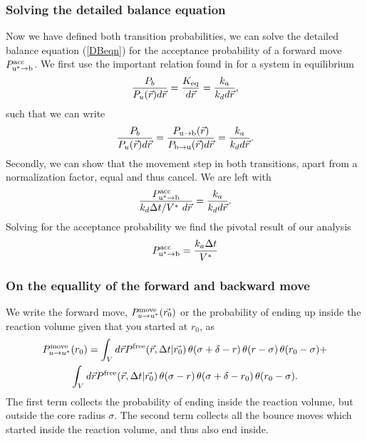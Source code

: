 \subsubsection{Solving the detailed balance equation}

Now we have defined both transition probabilities, we can solve the detailed balance equation (\ref{DBeqn}) for the acceptance probability of a forward move $P^{\rm acc}_{{\rm u}^* \rightarrow {\rm b}}$. We first use the important relation found in \cite{Morelli2008a} for a system in equilibrium
\begin{equation}
 \frac{P_b}{P_u(\vec{r})d\vec{r}} = \frac{K_{\rm eq}}{d\vec{r}} = \frac{k_a}{k_d d\vec{r}},
\end{equation}
such that we can write
\begin{equation}
 \frac{P_b}{P_u(\vec{r})d\vec{r}} = \frac{P_{ \rm{u} \rightarrow \rm{b} }(\vec{r})}{P_{ \rm{b} \rightarrow \rm{u} }(\vec{r})d\vec{r}} = \frac{k_a}{k_d d\vec{r}}.
\end{equation}
Secondly, we can show that the movement step in both transitions, apart from a normalization factor, equal and thus cancel. We are left with
\begin{equation}
 \frac{P^{\rm acc}_{{\rm u}^* \rightarrow {\rm b}}}{k_d \Delta t/V^* \,\, d\vec{r}} = \frac{k_a}{k_d d\vec{r}}.
\label{semi-pivotal}
\end{equation}
Solving for the acceptance probability we find the pivotal result of our analysis
\begin{equation}
 P^{\rm acc}_{{\rm u}^* \rightarrow {\rm b}} = \frac{k_a \Delta t}{V^*}
\label{pivotal}
\end{equation}

\subsubsection{On the equallity of the forward and backward move}

We write the forward move, $P^{\rm move}_{u \rightarrow u^*}(\vec{r_0})$ or the probability of ending up inside the reaction volume given that you started at $r_0$, as
\begin{multline}
 P^{\rm move}_{u \rightarrow u^*}(r_0) = \int_{V} d\vec{r} P^{\rm free}(\vec{r},\Delta t|\vec{r_0}) \, \theta(\sigma + \delta - r) \, \theta(r - \sigma) \, \theta(r_0 - \sigma) + \\ \int_{V} d\vec{r} P^{\rm free}(\vec{r},\Delta t|\vec{r_0}) \, \theta(\sigma - r) \, \theta(\sigma + \delta - r_0)  \, \theta(r_0 - \sigma).
\label{fwd_move}
\end{multline}
The first term collects the probability of ending inside the reaction volume, but outside the core radius $\sigma$. The second term collects all the bounce moves which started inside the reaction volume, and thus also end inside.

